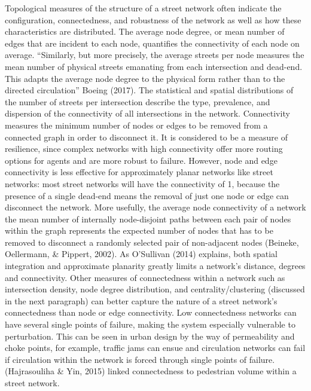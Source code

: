 Topological measures of the structure of a street network often indicate the configuration, connectedness, and robustness of the network as well as how these characteristics are distributed. The average node degree, or mean number of edges that are incident to each node, quantifies the connectivity of each node on average. “Similarly, but more precisely, the average streets per node measures the mean number of physical streets emanating from each intersection and dead-end. This adapts the average node degree to the physical form rather than to the directed circulation” Boeing (2017). The statistical and spatial distributions of the number of streets per intersection describe the type, prevalence, and dispersion of the connectivity of all intersections in the network. Connectivity measures the minimum number of nodes or edges to be removed from a connected graph in order to disconnect it. It is considered to be a measure of resilience, since complex networks with high connectivity offer more routing options for agents and are more robust to failure. However, node and edge connectivity is less effective for approximately planar networks like street networks: most street networks will have the connectivity of 1, because the presence of a single dead-end means the removal of just one node or edge can disconnect the network. More usefully, the average node connectivity of a network the mean number of internally node-disjoint paths between each pair of nodes within the graph represents the expected number of nodes that has to be removed to disconnect a randomly selected pair of non-adjacent nodes (Beineke, Oellermann, \& Pippert, 2002). As O'Sullivan (2014) explains, both spatial integration and approximate planarity greatly limits a network’s distance, degrees and connectivity. Other measures of connectedness within a network such as intersection density, node degree distribution, and centrality/clustering (discussed in the next paragraph) can better capture the nature of a street network's connectedness than node or edge connectivity. Low connectedness networks can have several single points of failure, making the system especially vulnerable to perturbation. This can be seen in urban design by the way of permeability and choke points, for example, traffic jams can ensue and circulation networks can fail if circulation within the network is forced through single points of failure. (Hajrasouliha \& Yin, 2015) linked connectedness to pedestrian volume within a street network.

